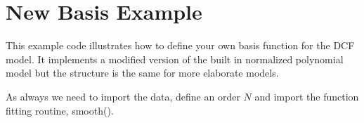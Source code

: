 \documentclass[letterpaper,10pt,english]{sphinxmanual}
\begin{document}
\section{New Basis Example}
\label{\detokenize{source/maxsmooth:new-basis-example}}
This example code illustrates how to define your own basis function for the
DCF model.
It implements a modified version of the built in normalized polynomial model
but the structure is the same for more elaborate models.

As always we need to import the data, define an order \({N}\)
and import the function fitting routine, smooth().

\begin{sphinxVerbatim}[commandchars=\\\{\}]
   
   

  
  

\end{sphinxVerbatim}
\end{document}
